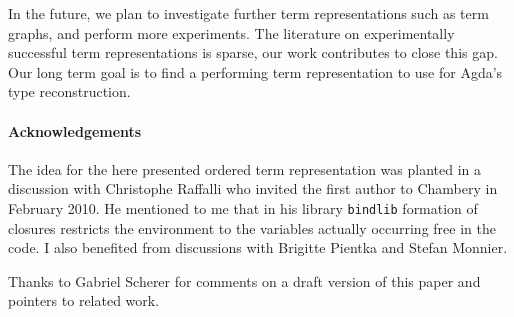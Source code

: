 \documentclass[submission,copyright,creativecommons]{eptcs}
\begin{document}
In the future, we plan to investigate further term representations
such as term graphs, and perform more experiments.  The literature on
experimentally successful term representations is sparse, our work
contributes to close this gap.  Our long term goal is to find a
performing term representation to use for Agda's type reconstruction.


\paragraph*{Acknowledgements}
The idea for the here presented ordered term representation was
planted in a discussion with Christophe Raffalli who invited the first
author to Chambery in February 2010.  He mentioned to me that in his
library \texttt{bindlib} formation of closures restricts the
environment to the variables actually occurring free in the code.  I
also benefited from discussions with Brigitte Pientka and Stefan Monnier.

Thanks to Gabriel Scherer for comments on a draft version of this
paper and pointers to related work.



\end{document}
